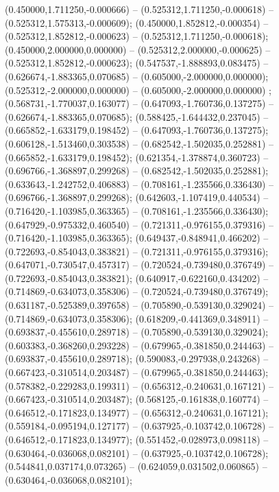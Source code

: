  (0.450000,1.711250,-0.000666) -- (0.525312,1.711250,-0.000618) -- (0.525312,1.575313,-0.000609);
 (0.450000,1.852812,-0.000354) -- (0.525312,1.852812,-0.000623) -- (0.525312,1.711250,-0.000618);
 (0.450000,2.000000,0.000000) -- (0.525312,2.000000,-0.000625) -- (0.525312,1.852812,-0.000623);
 (0.547537,-1.888893,0.083475) -- (0.626674,-1.883365,0.070685) -- (0.605000,-2.000000,0.000000);
 (0.525312,-2.000000,0.000000) -- (0.605000,-2.000000,0.000000) ;
 (0.568731,-1.770037,0.163077) -- (0.647093,-1.760736,0.137275) -- (0.626674,-1.883365,0.070685);
 (0.588425,-1.644432,0.237045) -- (0.665852,-1.633179,0.198452) -- (0.647093,-1.760736,0.137275);
 (0.606128,-1.513460,0.303538) -- (0.682542,-1.502035,0.252881) -- (0.665852,-1.633179,0.198452);
 (0.621354,-1.378874,0.360723) -- (0.696766,-1.368897,0.299268) -- (0.682542,-1.502035,0.252881);
 (0.633643,-1.242752,0.406883) -- (0.708161,-1.235566,0.336430) -- (0.696766,-1.368897,0.299268);
 (0.642603,-1.107419,0.440534) -- (0.716420,-1.103985,0.363365) -- (0.708161,-1.235566,0.336430);
 (0.647929,-0.975332,0.460540) -- (0.721311,-0.976155,0.379316) -- (0.716420,-1.103985,0.363365);
 (0.649437,-0.848941,0.466202) -- (0.722693,-0.854043,0.383821) -- (0.721311,-0.976155,0.379316);
 (0.647071,-0.730547,0.457317) -- (0.720524,-0.739480,0.376749) -- (0.722693,-0.854043,0.383821);
 (0.640917,-0.622160,0.434202) -- (0.714869,-0.634073,0.358306) -- (0.720524,-0.739480,0.376749);
 (0.631187,-0.525389,0.397658) -- (0.705890,-0.539130,0.329024) -- (0.714869,-0.634073,0.358306);
 (0.618209,-0.441369,0.348911) -- (0.693837,-0.455610,0.289718) -- (0.705890,-0.539130,0.329024);
 (0.603383,-0.368260,0.293228) -- (0.679965,-0.381850,0.244463) -- (0.693837,-0.455610,0.289718);
 (0.590083,-0.297938,0.243268) -- (0.667423,-0.310514,0.203487) -- (0.679965,-0.381850,0.244463);
 (0.578382,-0.229283,0.199311) -- (0.656312,-0.240631,0.167121) -- (0.667423,-0.310514,0.203487);
 (0.568125,-0.161838,0.160774) -- (0.646512,-0.171823,0.134977) -- (0.656312,-0.240631,0.167121);
 (0.559184,-0.095194,0.127177) -- (0.637925,-0.103742,0.106728) -- (0.646512,-0.171823,0.134977);
 (0.551452,-0.028973,0.098118) -- (0.630464,-0.036068,0.082101) -- (0.637925,-0.103742,0.106728);
 (0.544841,0.037174,0.073265) -- (0.624059,0.031502,0.060865) -- (0.630464,-0.036068,0.082101);
